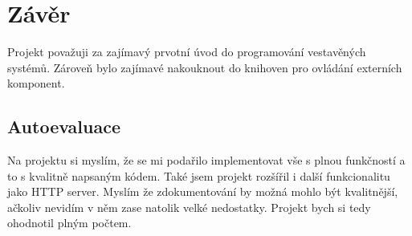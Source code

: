 \section{Závěr}
Projekt považuji za zajímavý prvotní úvod do programování vestavěných systémů. Zároveň bylo zajímavé nakouknout do knihoven pro ovládání externích komponent.

\subsection*{Autoevaluace}
Na projektu si myslím, že se mi podařilo implementovat vše s plnou funkčností a to s kvalitně napsaným kódem. Také jsem projekt rozšířil i další funkcionalitu jako HTTP server. Myslím že zdokumentování by možná mohlo být kvalitnější, ačkoliv nevidím v něm zase natolik velké nedostatky. Projekt bych si tedy ohodnotil plným počtem.
